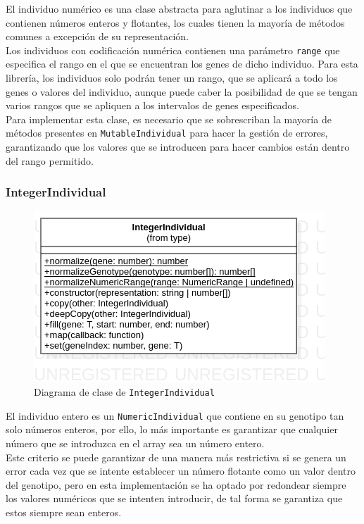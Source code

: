 El individuo numérico es una clase abstracta para aglutinar a los individuos que contienen números enteros y flotantes, los cuales tienen la mayoría de métodos comunes a excepción de su representación. \\

Los individuos con codificación numérica contienen una parámetro \texttt{range} que especifica el rango en el que se encuentran los genes de dicho individuo. Para esta librería, los individuos solo podrán tener un rango, que se aplicará a todo los genes o valores del individuo, aunque puede caber la posibilidad de que se tengan varios rangos que se apliquen a los intervalos de genes especificados. \\

Para implementar esta clase, es necesario que se sobrescriban la mayoría de métodos presentes en \texttt{MutableIndividual} para hacer la gestión de errores, garantizando que los valores que se introducen para hacer cambios están dentro del rango permitido.

\subsubsection{IntegerIndividual}

\begin{figure}[ht]
    \centering
    \includegraphics[scale=0.7]{mem/images/cap-4/4.2.2(Individuos)/IntegerIndividual.png}
    \caption{Diagrama de clase de \texttt{IntegerIndividual}}
    \label{fig:binaryindividual-uml}
\end{figure}

El individuo entero es un \texttt{NumericIndividual} que contiene en su genotipo tan solo números enteros, por ello, lo más importante es garantizar que cualquier número que se introduzca en el array sea un número entero. \\

Este criterio se puede garantizar de una manera más restrictiva si se genera un error cada vez que se intente establecer un número flotante como un valor dentro del genotipo, pero en esta implementación se ha optado por redondear siempre los valores numéricos que se intenten introducir, de tal forma se garantiza que estos siempre sean enteros.

